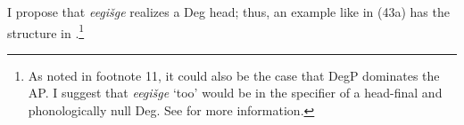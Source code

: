 \documentclass[output=paper]{LSP/langsci}
\begin{document}
\begin{exe}
\ex\label{ex:rosen:43}
\begin{xlist}




\end{xlist}
\end{exe}

I propose that \textit{eegišge} realizes a Deg head; thus, an example like in (43a) has the structure in .\footnote{As noted in footnote 11, it could also be the case that DegP dominates the AP. I suggest that \textit{eegišge} `too' would be in the specifier of a head-final and phonologically null Deg. See \citet{Rosen2015} for more information.}

\begin{exe}
\ex \label{ex:rosen:44}
{\hspace{1em}}\newline
{}
\end{exe}
\end{document}
